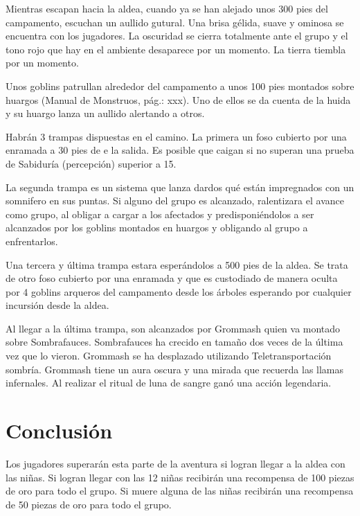 \documentclass[10pt,twoside,twocolumn,openany]{dndbook}
\begin{document}
\begin{DndReadAloud}
Mientras escapan hacia la aldea, cuando ya se han alejado unos 300 pies del campamento, escuchan 
un aullido gutural. Una brisa gélida, suave y ominosa se encuentra con los jugadores. La oscuridad
se cierra totalmente ante el grupo y el tono rojo que hay en el ambiente desaparece por un momento.
La tierra tiembla por un momento.
\end{DndReadAloud}

Unos goblins patrullan alrededor del campamento a unos 100 pies montados sobre huargos (Manual 
de Monstruos, pág.: xxx). Uno de ellos se da cuenta de la huida y su huargo lanza un aullido 
alertando a otros.

Habrán 3 trampas dispuestas en el camino. La primera un foso cubierto por una enramada a 30 pies de e
la salida. Es posible que caigan si no superan una prueba de Sabiduría (percepción) superior a 15.

La segunda trampa es un sistema que lanza dardos qué están impregnados con un somnifero en sus puntas. 
Si alguno del grupo es alcanzado, ralentizara el avance como grupo, al obligar a cargar a los afectados 
y predisponiéndolos a ser alcanzados por los goblins montados en huargos y obligando al grupo a 
enfrentarlos.

Una tercera y última trampa estara esperándolos a 500 pies de la aldea. Se trata de otro foso cubierto
por una enramada y que es custodiado de manera oculta por 4 goblins arqueros del campamento desde los 
árboles esperando por cualquier incursión desde la aldea. 

Al llegar a la última trampa, son alcanzados por Grommash quien va montado sobre Sombrafauces.
Sombrafauces ha crecido en tamaño dos veces de la última vez que lo vieron. Grommash se ha desplazado
utilizando Teletransportación sombría. Grommash tiene un aura oscura y una mirada que recuerda las llamas 
infernales. Al realizar el ritual de luna de sangre ganó una acción legendaria.

\section{Conclusión}

Los jugadores superarán esta parte de la aventura si logran llegar a la aldea con las niñas. Si 
logran llegar con las 12 niñas recibirán una recompensa de 100 piezas de oro para todo el grupo. Si
muere alguna de las niñas recibirán una recompensa de 50 piezas de oro para todo el grupo.
\end{document}
